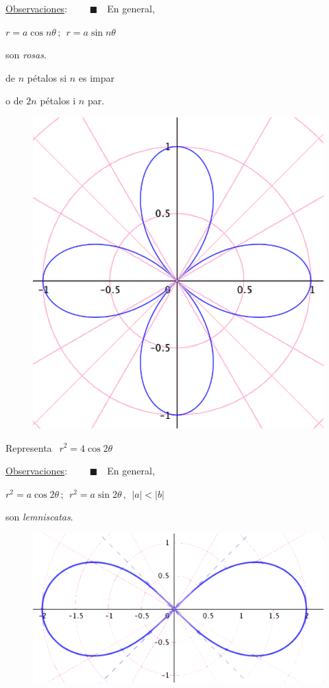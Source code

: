 \begin{multicols}{2}
\underline{Observaciones}: 
\tiny{$\qquad \blacksquare \quad $}\normalsize{En} general, 

\hspace{10mm}$r=a \cos n \theta\, ; \ \ r=a  \sin n \theta\ $ 

\hspace{10mm} son \emph{rosas}. 

\hspace{10mm} de $n$ pétalos si $n$ es impar 

\hspace{10mm} o de $2n$ pétalos i $n$ par.	

\begin{figure}[H]
	\centering
	\includegraphics[width=.25\textwidth]{img-polares/polares27.png}
\end{figure}
\end{multicols}


\vspace{5mm}
\begin{mipropuesto}

Representa $\ \ r^2=4\cos 2\theta$
\end{mipropuesto}

\begin{multicols}{2}

\underline{Observaciones}: 
\tiny{$\qquad \blacksquare \quad $}\normalsize{En} general, 



\hspace{10mm}$r^2=a \cos 2\theta \, ; \ \ r^2=a \sin 2\theta\, , \ \ |a|<|b| $ 

\hspace{10mm}son \emph{lemniscatas}.


\begin{figure}[H]
	\centering
	\includegraphics[width=.3\textwidth]{img-polares/polares50.png}
\end{figure}
\end{multicols}


